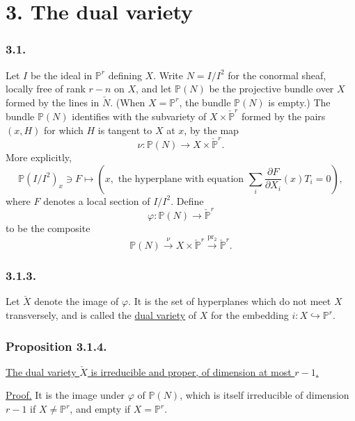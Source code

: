 \section*{3. The dual variety}

\subsubsection*{3.1.}
Let $I$ be the ideal in $\mathbb P^r$ defining $X$.  Write
$N=I/I^2$ for the conormal sheaf, locally free of rank $r-n$ on $X$,
and let $\mathbb P(N)$ be the projective bundle over $X$ formed by the
lines in $\check N$.  (When $X=\mathbb P^r$, the bundle
$\mathbb P(N)$ is empty.)  The bundle $\mathbb P(N)$ identifies with
the subvariety of $X\times\check{\mathbb P}^{r}$ formed by the pairs
$(x,H)$ for which $H$ is tangent to $X$ at $x$, by the map
\[
\nu:\mathbb P(N)\longrightarrow X\times\check{\mathbb P}^{r}.
\]
More explicitly,
\begin{equation}\tag{3.1.1}
\mathbb P(I/I^2)_x\ni F\longmapsto
\left(x,\text{ the hyperplane with equation }
\sum_i\frac{\partial F}{\partial X_i}(x)T_i=0\right),
\end{equation}
where $F$ denotes a local section of $I/I^2$.  Define
\begin{equation}\tag{3.1.2}
\varphi:\mathbb P(N)\longrightarrow\check{\mathbb P}^{r}
\end{equation}
to be the composite
\[
\mathbb P(N)\xrightarrow{\nu}
X\times\check{\mathbb P}^{r}
\xrightarrow{\operatorname{pr}_2}\check{\mathbb P}^{r}.
\]

\subsubsection*{3.1.3.}
Let $\check X$ denote the image of $\varphi$.  It is the set of
hyperplanes which do not meet $X$ transversely, and is called the
\underline{dual variety} of $X$ for the embedding
$i:X\hookrightarrow\mathbb P^r$.

\subsubsection*{Proposition 3.1.4.}
\underline{The dual variety $\check X$ is irreducible and proper, of
dimension at most $r-1$.}

\noindent\underline{Proof.}
It is the image under $\varphi$ of $\mathbb P(N)$, which is itself
irreducible of dimension $r-1$ if $X\ne\mathbb P^r$, and empty if
$X=\mathbb P^r$.

